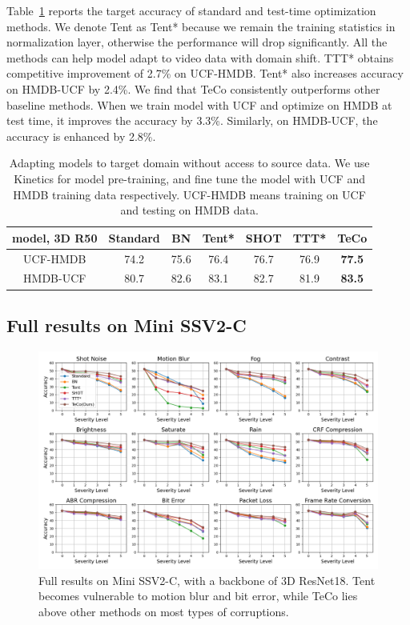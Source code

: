 \documentclass{article} %
\begin{document}
Table~\ref{domain-table} reports the target accuracy of standard and test-time optimization methods. We denote Tent as Tent* because we remain the training statistics in normalization layer, otherwise the performance will drop significantly. All the methods can help model adapt to video data with domain shift. TTT* obtains competitive improvement of 2.7\% on UCF-HMDB. Tent* also increases accuracy on HMDB-UCF by 2.4\%. We find that TeCo consistently outperforms other baseline methods. When we train model with UCF and optimize on HMDB at test time, it improves the accuracy by 3.3\%. Similarly, on HMDB-UCF, the accuracy is enhanced by 2.8\%.
\begin{table}[h]
\caption{Adapting models to target domain without access to source data. We use Kinetics for model pre-training, and fine tune the model with UCF and HMDB training data respectively. UCF-HMDB means training on UCF and testing on HMDB data.}
\label{domain-table}
\begin{center}
\begin{tabular}{c|c | c c c c c }
\toprule
model, 3D R50 &  Standard & BN &  Tent* &  SHOT & TTT* & TeCo \\
\midrule
UCF-HMDB & 74.2 & 75.6& 76.4 & 76.7& 76.9 &\textbf{77.5} \\
HMDB-UCF & 80.7 & 82.6 & 83.1 & 82.7& 81.9 &\textbf{83.5} \\
\bottomrule
\end{tabular}
\end{center}
\end{table}

\subsection{Full results on Mini SSV2-C}
\begin{figure}[h]
\begin{center}
        \includegraphics[width=0.92\linewidth]{./images/ssv2-i3d-resnet18-full-plot-v2.png}
\end{center}
\caption{Full results on Mini SSV2-C, with a backbone of 3D ResNet18. Tent becomes vulnerable to motion blur and bit error, while TeCo lies above other methods on most types of corruptions. }
\vspace{-0.3cm}
\label{fig:full-ssv2-c}
\end{figure}
\end{document}
